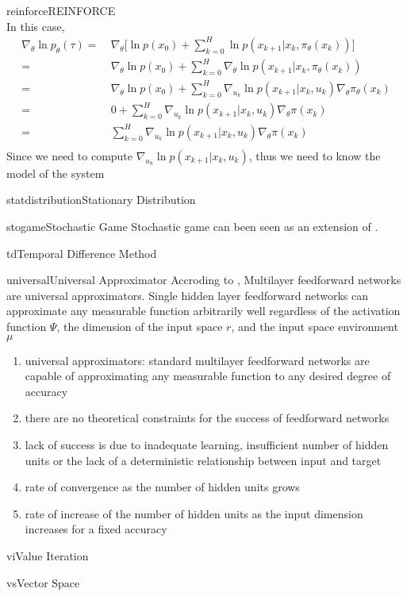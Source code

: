 \documentclass[9pt]{article}
\begin{document}
\begin{topic}{reinforce}{REINFORCE}
\[\]
In this case, 
\[
\begin{split}
\nabla_{\theta} \ln p_{\theta}(\tau) = &\ \nabla_{\theta} \big[ \ln p(x_0) + \sum_{k=0}^{H} \ln p(x_{k+1}|x_k,\pi_{\theta}(x_k))\big]\\
= &\ \nabla_{\theta} \ln p(x_0) + \sum_{k=0}^{H} \nabla_{\theta} \ln p(x_{k+1}|x_k,\pi_{\theta}(x_k))\\
= &\ \nabla_{\theta} \ln p(x_0) + \sum_{k=0}^{H} \nabla_{u_k} \ln p(x_{k+1}|x_k,u_k) \nabla_{\theta} \pi_{\theta}(x_k)\\
= &\ 0 +  \sum_{k=0}^{H} \nabla_{u_k} \ln p(x_{k+1}|x_k,u_k) \nabla_{\theta} \pi(x_k)\\
= &\ \sum_{k=0}^{H} \nabla_{u_k} \ln p(x_{k+1}|x_k,u_k) \nabla_{\theta} \pi(x_k)\\
\end{split}
\]
Since we need to compute $\nabla_{u_k} \ln p(x_{k+1}|x_k,u_k)$, thus we need to know the model of the system
\end{topic}


\begin{topic}{statdistribution}{Stationary Distribution}
\Working
\end{topic}

\begin{topic}{stogame}{Stochastic Game}
Stochastic game can been seen as an extension of .
\end{topic}

\begin{topic}{td}{Temporal Difference Method} 
\end{topic}

\begin{topic}{universal}{Universal Approximator} 
Accroding to \citep{hornik1989multilayer}, Multilayer feedforward networks are universal approximators. Single hidden layer  feedforward networks can approximate any measurable function arbitrarily well regardless of the activation function $\Psi$, the dimension of the input space $r$, and the input space environment $\mu$
\begin{enumerate}
\item universal approximators: standard multilayer feedforward networks are capable of approximating
any measurable function to any desired degree of accuracy
\item there are no theoretical constraints for the success of
feedforward networks
\item lack of success is due to inadequate learning, insufficient number of hidden units or the lack of a deterministic relationship between input and target
\item rate of convergence as the number of hidden units grows
\item rate of increase of the number of hidden units as the input dimension increases for a fixed accuracy
\end{enumerate}
\end{topic}

\begin{topic}{vi}{Value Iteration} 
\Working
\end{topic}

\begin{topic}{vs}{Vector Space}
\Working
\end{topic}


\end{document}
